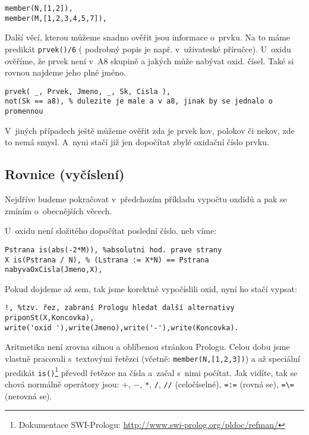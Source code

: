 \documentclass[a4paper]{article}
\begin{document}
\begin{verbatim}
member(N,[1,2]),
member(M,[1,2,3,4,5,7]),
\end{verbatim}

Další věcí, kterou můžeme snadno ověřit jsou informace o~prvku. Na to máme predikát \texttt{prvek()/6} (
podrobný popis je např. v~uživateské příručce).  
U~oxidu ověříme, že prvek není v~A8 skupině a jakých může nabývat oxid. čísel. Také si rovnou najdeme jeho 
plné jméno.

\begin{verbatim}
prvek( _, Prvek, Jmeno, _, Sk, Cisla ),
not(Sk == a8), % dulezite je male a v a8, jinak by se jednalo o promennou
\end{verbatim}

V~jiných případech ještě můžeme ověřit zda je prvek kov, polokov či nekov, zde to nemá smysl. A~nyni stačí
již jen dopočítat zbylé oxidační číslo prvku.

\subsection{Rovnice (vyčíslení)}
Nejdříve budeme pokračovat v~předchozím příkladu vypočtu oxdidů a pak se zmíním o~obecnějších věcech.

U~oxidu není složitého dopočítat poslední číslo, neb víme:

\begin{verbatim}
Pstrana is(abs(-2*M)), %absolutni hod. prave strany
X is(Pstrana / N), % (Lstrana := X*N) == Pstrana
nabyvaOxCisla(Jmeno,X),
\end{verbatim}

Pokud dojdeme až sem, tak jsme korektně vypočíslili oxid, nyní ho stačí vypsat:

\begin{verbatim}
!, %tzv. řez, zabraní Prologu hledat další alternativy
priponSt(X,Koncovka), 
write('oxid '),write(Jmeno),write('-'),write(Koncovka).
\end{verbatim}

Aritmetika není zrovna silnou a oblíbenou stránkou Prologu. Celou dobu jsme vlastně pracovali s~textovými
řetězci (včetně: \texttt{member(N,[1,2,3])}) a až speciální predikát \texttt{is()}\footnote{
Dokumentace SWI-Prologu: 
\href{http://www.swi-prolog.org/pldoc/refman/}{http://www.swi-prolog.org/pldoc/refman/}}
převedl řetězce na čísla a~začal s~nimi počítat. Jak vidíte, tak se chová normálně operátory jsou: 
\texttt{$+$}, \texttt{$-$}, \texttt{*}, \texttt{/}, \texttt{//} (celočíselné), \texttt{=:=} (rovná se), \verb+=\=+ (nerovná se).
\end{document}
